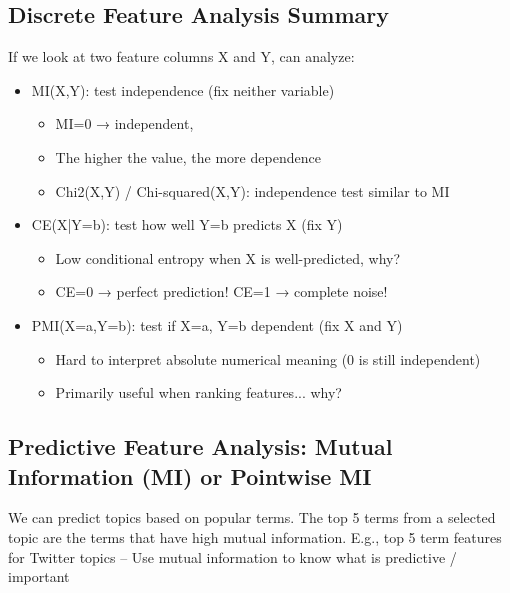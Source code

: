 \documentclass[11pt]{article}
\theoremstyle{definition}
\begin{document}
\subsection{Discrete Feature Analysis Summary}
If we look at two feature columns X and Y, can analyze:
\begin{itemize}
  \item MI(X,Y): test independence (fix neither variable)
  \begin{itemize}
    \item MI=0 → independent,
    \item The higher the value, the more dependence
    \item Chi2(X,Y) / Chi-squared(X,Y): independence test similar to MI
  \end{itemize}
  \item CE(X|Y=b): test how well Y=b predicts X (fix Y)
  \begin{itemize}
    \item Low conditional entropy when X is well-predicted, why?
    \item CE=0 → perfect prediction! CE=1 → complete noise!
  \end{itemize}
  \item PMI(X=a,Y=b): test if X=a, Y=b dependent (fix X and Y)
  \begin{itemize}
    \item Hard to interpret absolute numerical meaning (0 is still independent)
    \item Primarily useful when ranking features... why?
  \end{itemize}
\end{itemize}
\subsection{Predictive Feature Analysis:
Mutual Information (MI) or Pointwise MI}
We can predict topics based on popular terms. The top 5 terms from a selected topic are the terms that have high mutual information.
E.g., top 5 term features for Twitter topics
– Use mutual information to know what is
predictive / important
\end{document}
